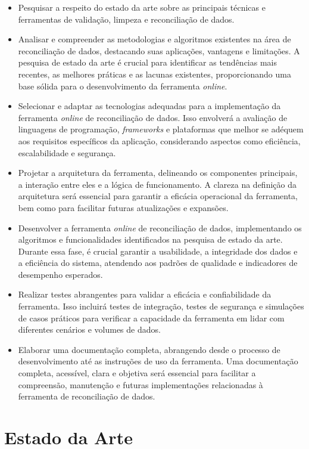 \begin{itemize}
    \item Pesquisar a respeito do estado da arte sobre as principais técnicas e ferramentas de validação, limpeza e reconciliação de dados. 
    \item Analisar e compreender as metodologias e algoritmos existentes na área de reconciliação de dados, destacando suas aplicações, vantagens e limitações. A pesquisa de estado da arte é crucial para identificar as tendências mais recentes, as melhores práticas e as lacunas existentes, proporcionando uma base sólida para o desenvolvimento da ferramenta \textit{online}.
    \item Selecionar e adaptar as tecnologias adequadas para a implementação da ferramenta \textit{online} de reconciliação de dados. Isso envolverá a avaliação de linguagens de programação, \textit{frameworks} e plataformas que melhor se adéquem aos requisitos específicos da aplicação, considerando aspectos como eficiência, escalabilidade e segurança.
    \item Projetar a arquitetura da ferramenta, delineando os componentes principais, a interação entre eles e a lógica de funcionamento. A clareza na definição da arquitetura será essencial para garantir a eficácia operacional da ferramenta, bem como para facilitar futuras atualizações e expansões.
    \item Desenvolver a ferramenta \textit{online} de reconciliação de dados, implementando os algoritmos e funcionalidades identificados na pesquisa de estado da arte. Durante essa fase, é crucial garantir a usabilidade, a integridade dos dados e a eficiência do sistema, atendendo aos padrões de qualidade e indicadores de desempenho esperados.
    \item Realizar testes abrangentes para validar a eficácia e confiabilidade da ferramenta. Isso incluirá testes de integração, testes de segurança e simulações de casos práticos para verificar a capacidade da ferramenta em lidar com diferentes cenários e volumes de dados.   
    \item Elaborar uma documentação completa, abrangendo desde o processo de desenvolvimento até as instruções de uso da ferramenta. Uma documentação completa, acessível, clara e objetiva será essencial para facilitar a compreensão, manutenção e futuras implementações relacionadas à ferramenta de reconciliação de dados.
\end{itemize}

\section{Estado da Arte}

